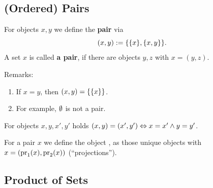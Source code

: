 \documentclass[12pt]{book}
\begin{document}
\subsection{(Ordered) Pairs}
\label{sec:ordpairs}

\begin{defi}\label{def:pairs}
      For objects $x, y$ we define the \textbf{pair}  via
      \begin{displaymath}
            (x,y) := \{ \{ x \},\{ x,y \} \}.
      \end{displaymath}
      A set $x$ is called \textbf{a pair}, if there are objects $y,z$ with $x = (y,z)$.
\end{defi}
Remarks:
\begin{enumerate}
      \item If $x=y$, then $(x,y) = \{ \{ x \} \}$.
      \item For example, $\emptyset$ is not a pair.
\end{enumerate}
\begin{lem}\label{lem:pairs}
      For objects $x, y, x', y'$ holds $(x,y) = (x',y') \Leftrightarrow x = x' \wedge y = y'$.
\end{lem}
\begin{defi}\label{def:projpairs}
      For a pair $x$ we define the object ,  as those unique objects with $x = (\operatorname{pr}_1(x), \operatorname{pr}_2(x))$ (``projections'').
\end{defi}
\subsection{Product of Sets}
\label{sec:productsets}
\end{document}
